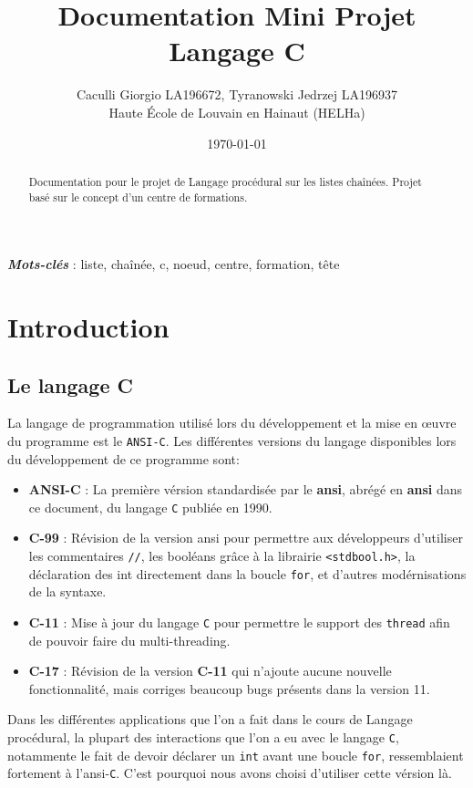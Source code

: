 \documentclass[11pt]{article}
\title{Documentation Mini Projet Langage C}
\author{Caculli Giorgio LA196672, Tyranowski Jedrzej LA196937\\Haute École de Louvain en Hainaut (HELHa)}
\date{\today}
\begin{document}
\maketitle
\begin{abstract}
  Documentation pour le projet de Langage procédural sur les listes chaînées. Projet basé sur le concept
  d'un centre de formations.
\end{abstract}
\textbf{\textit{Mots-clés}} : liste, chaînée, c, noeud, centre, formation, tête

\newpage
\tableofcontents

\newpage
\section{Introduction}

\subsection{Le langage C}
La langage de programmation utilisé lors du développement et la mise en \oe{}uvre du programme est le
\texttt{ANSI-C}. Les différentes versions du langage disponibles lors du développement de ce programme sont:
\begin{itemize}
\item \textbf{ANSI-C} : La première vérsion standardisée par le \textbf{\acrlong{ansi}},
  abrégé en \textbf{\acrshort{ansi}} dans ce document, du langage \texttt{C} publiée en 1990.
\item \textbf{C-99} : Révision de la version \acrshort{ansi} pour permettre aux développeurs d'utiliser les
  commentaires \texttt{//}, les booléans grâce à la librairie \texttt{<stdbool.h>}, la déclaration des int
  directement dans la boucle \texttt{for}, et d'autres modérnisations de la syntaxe.
\item \textbf{C-11} : Mise à jour du langage \texttt{C} pour permettre le support des \texttt{thread} afin de pouvoir faire du multi-threading.
\item \textbf{C-17} : Révision de la version \textbf{C-11} qui n'ajoute aucune nouvelle fonctionnalité, mais
  corriges beaucoup bugs présents dans la version 11.
\end{itemize}
Dans les différentes applications que l'on a fait dans le cours de Langage procédural, la plupart des
interactions que l'on a eu avec le langage \texttt{C}, notammente le fait de devoir déclarer un \texttt{int}
avant une boucle \texttt{for}, ressemblaient fortement à l'\acrshort{ansi}-\texttt{C}. C'est pourquoi nous
avons choisi d'utiliser cette vérsion là.
\end{document}

